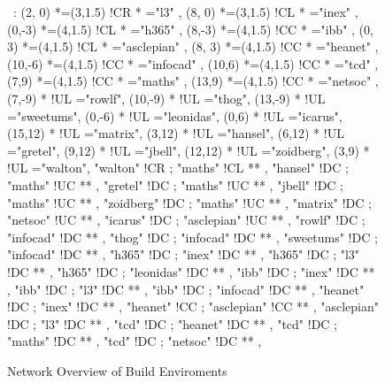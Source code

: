 
\begin{figure}

\begin{center}

\ \xy<1cm,0cm>:
(2, 0)  	*=(3,1.5) !CR  						*\frm{-} ="l3" , 
(8, 0)  	*=(3,1.5) !CL  							*\frm{-} ="inex" , 
(0,-3) 	*=(4,1.5) !CL  					*\frm{-} ="h365" , 
(8,-3) 	*=(4,1.5) !CC  			*\frm{-} ="ibb" , 
(0, 3)  	*=(4,1.5) !CL  					*\frm{-} ="asclepian" , 
(8, 3)  	*=(4,1.5) !CC  						*\frm{-} ="heanet" , 
(10,-6)  *=(4,1.5) !CC  						*\frm{-} ="infocad" , 
(10,6)  	*=(4,1.5) !CC  			*\frm{-} ="tcd" , 
(7,9)  	*=(4,1.5) !CC  *\frm{-} ="maths" , 
(13,9)  	*=(4,1.5) !CC  						*\frm{-} ="netsoc" , 
%
\POS (7,-9) * !UL ="rowlf",
\POS (10,-9) * !UL ="thog",
\POS (13,-9) * !UL ="sweetums",
%
\POS (0,-6) * !UL ="leonidas",
%
\POS (0,6) * !UL ="icarus",
%
\POS (15,12) * !UL ="matrix",
%
\POS (3,12) * !UL ="hansel",
\POS (6,12) * !UL ="gretel",
\POS (9,12) * !UL ="jbell",
\POS (12,12) * !UL ="zoidberg",
\POS (3,9) * !UL ="walton",
%
"walton" 	!CR ; "maths" 		!CL **\dir{-} ,
"hansel" 	!DC ; "maths" 		!UC **\dir{-} ,
"gretel" 	!DC ; "maths" 		!UC **\dir{-} ,
"jbell"  	!DC ; "maths" 		!UC **\dir{-} ,
"zoidberg"  !DC ; "maths" 		!UC **\dir{-} ,
%
"matrix"  	!DC ; "netsoc" 	!UC **\dir{-} ,
%
"icarus"  	!DC ; "asclepian" !UC **\dir{-} ,
%
"rowlf"  	!DC ; "infocad" 	!DC **\dir{-} ,
"thog"	  	!DC ; "infocad" 	!DC **\dir{-} ,
"sweetums" 	!DC ; "infocad" 	!DC **\dir{-} ,
%
"h365" 		!DC ; "inex" 		!DC **\dir{-} ,
"h365" 		!DC ; "l3" 			!DC **\dir{-} ,
"h365" 		!DC ; "leonidas" 	!DC **\dir{-} ,
%
"ibb" 		!DC ; "inex" 		!DC **\dir{-} ,
"ibb" 		!DC ; "l3" 			!DC **\dir{-} ,
"ibb" 		!DC ; "infocad" 	!DC **\dir{-} ,
%
"heanet" 	!DC ; "inex" 		!DC **\dir{-} ,
"heanet" 	!CC ; "asclepian" !CC **\dir{-} ,
%
"asclepian" !DC ; "l3" 			!DC **\dir{-} ,
%
"tcd" 		!DC ; "heanet" 	!DC **\dir{-} ,
"tcd" 		!DC ; "maths" 		!DC **\dir{-} ,
"tcd" 		!DC ; "netsoc" 	!DC **\dir{-} ,
\endxy

\end{center}

\caption{Network Overview of Build Enviroments}

\end{figure}
